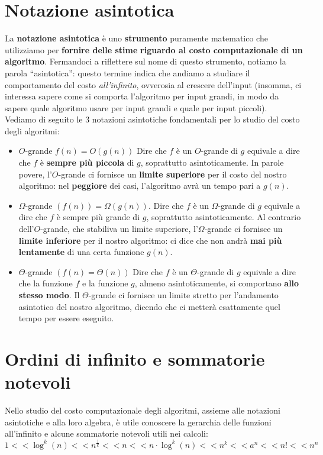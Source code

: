\documentclass[12pt]{report}
\begin{document}
	\section{Notazione asintotica}
    La \textbf{notazione asintotica} è uno \textbf{strumento} puramente matematico che utilizziamo per \textbf{fornire delle stime} \textbf{riguardo al costo computazionale di un algoritmo}.
    Fermandoci a riflettere sul nome di questo strumento, notiamo la parola “asintotica”: questo termine indica che andiamo a studiare il comportamento del costo \textit{all'infinito}, ovverosia al crescere dell’input (insomma, ci interessa sapere come si comporta l’algoritmo per input grandi, in modo da sapere quale algoritmo usare per input grandi e quale per input piccoli).\\
    Vediamo di seguito le 3 notazioni asintotiche fondamentali per lo studio del costo degli algoritmi:
    \begin{itemize}
        
        \item $O$-grande $f(n) = O(g(n))$
        Dire che $f$ è un $O$-grande di $g$ equivale a dire che $f$ è \textbf{sempre più piccola} di $g$, soprattutto asintoticamente.
        In parole povere, l’$O$-grande ci fornisce un \textbf{limite superiore} per il costo del nostro algoritmo: nel \textbf{peggiore} dei casi, l’algoritmo avrà un tempo pari a $g(n)$.
        		
        \item $\Omega$-grande $(f(n)) = \Omega(g(n))$.
		Dire che $f$ è un $\Omega$-grande di $g$ equivale a dire che $f$ è sempre più grande di $g$, soprattutto asintoticamente. Al contrario dell’$O$-grande, che stabiliva un limite superiore, l’$\Omega$-grande ci fornisce un \textbf{limite inferiore} per il nostro algoritmo: ci dice che non andrà \textbf{mai più} \textbf{lentamente} di una certa funzione $g(n)$.
        		
		\item $\Theta$-grande $(f(n) = \Theta(n))$
		Dire che $f$ è un $\Theta$-grande di $g$ equivale a dire che la funzione $f$ e la funzione $g$, almeno asintoticamente, si comportano \textbf{allo stesso modo}. 
		Il $\Theta$-grande ci fornisce un limite stretto per l’andamento asintotico del nostro algoritmo, dicendo che ci metterà esattamente quel tempo per essere eseguito.
        
	\end{itemize}
        
	\section{Ordini di infinito e sommatorie notevoli}
	Nello studio del costo computazionale degli algoritmi, assieme alle notazioni asintotiche e alla loro algebra, è utile conoscere la gerarchia delle funzioni all'infinito e alcune sommatorie notevoli utili nei calcoli:
	\[
		1 << \log^k(n) << n^{\frac{1}{k}} << n << n\cdot \log^k(n) << n^k << a^n << n! << n^n
    \]
      
\end{document}
